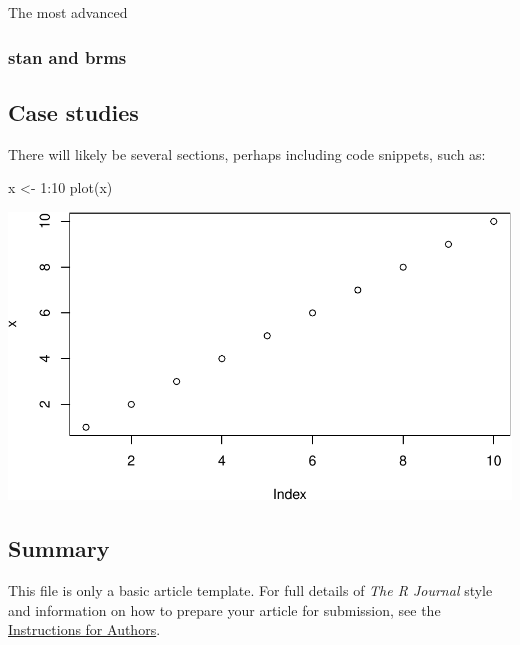 The most advanced

\hypertarget{stan-and-brms}{%
\subsubsection{stan and brms}\label{stan-and-brms}}

\hypertarget{case-studies}{%
\subsection{Case studies}\label{case-studies}}

There will likely be several sections, perhaps including code snippets,
such as:

\begin{Schunk}
\begin{Sinput}
x <- 1:10
plot(x)
\end{Sinput}

\includegraphics{overview-single-source_files/figure-latex/unnamed-chunk-3-1} \end{Schunk}

\hypertarget{summary}{%
\subsection{Summary}\label{summary}}

This file is only a basic article template. For full details of
\emph{The R Journal} style and information on how to prepare your
article for submission, see the
\href{https://journal.r-project.org/share/author-guide.pdf}{Instructions
for Authors}.



\address{%
Maciej Beręsewicz\\
Poznań University of Economics and Business\\%
Al. Niepodległości 10\\ 61-875 Poznań, Poland\\
Statistical Office in Poznań\\%
ul. Wojska Polskiego 27/29\\ 60-624 Poznań, Poland\\
%
\url{https://ncn-foreigners.github.io/}\\%
\textit{ORCiD: \href{https://orcid.org/0000-0002-8281-4301}{0000-0002-8281-4301}}\\%
\href{mailto:maciej.beresewicz@ue.poznan.pl}{\nolinkurl{maciej.beresewicz@ue.poznan.pl}}%
}

